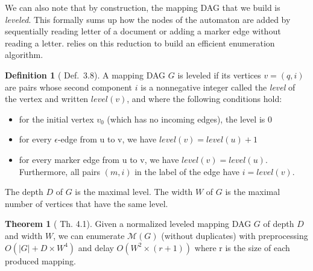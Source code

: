 \documentclass[12px]{article}
\theoremstyle{definition}
\newtheorem{definition}{Definition}
\newtheorem{theorem}{Theorem}
\begin{document}
        We can also note that by construction, the mapping DAG that we build is
        \textit{leveled}. This formally sums up how the nodes of the automaton
        are added by sequentially reading letter of a document or adding a
        marker edge without reading a letter. \cite{ICDT19} relies on this
        reduction to build an efficient enumeration algorithm.

        \begin{definition}[\cite{ICDT19} Def.\ 3.8]
          A mapping DAG $G$ is leveled if its vertices $v = (q, i)$ are pairs
          whose second component $i$ is a nonnegative integer called the
          \textit{level} of the vertex and written $level(v)$, and where the
          following conditions hold:
            \begin{itemize}
              \item for the initial vertex $v_0$ (which has no incoming edges),
                the level is $0$
              \item for every $\epsilon$-edge from u to v, we have $level(v) =
                level(u) + 1$
              \item for every marker edge from u to v, we have $level(v) =
                level(u)$. Furthermore, all pairs $(m, i)$ in the label of the
                edge have $i = level(v)$.
            \end{itemize}

          The depth $D$ of $G$ is the maximal level. The width $W$ of $G$ is
          the maximal number of vertices that have the same level.
        \end{definition}

        \begin{theorem}[\cite{ICDT19} Th. 4.1]
          Given a normalized leveled mapping DAG $G$ of depth $D$ and width
          $W$, we can enumerate $\mathcal{M}(G)$ (without duplicates) with
          preprocessing $O(|G| + D \times W^4 )$ and delay $O(W^2 \times (r +
          1))$ where r is the size of each produced mapping.
        \end{theorem}
\end{document}
